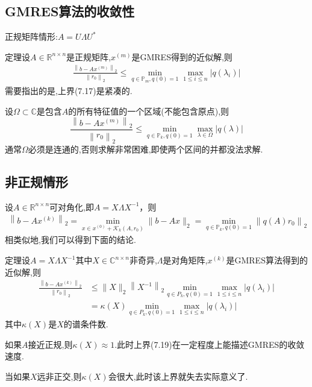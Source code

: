 \documentclass[12pt,a4paper]{article}
\begin{document}
\subsection*{GMRES算法的收敛性}
正规矩阵情形:{\color{blue}$A=U \Lambda U^{*}$}

{\color{blue}定理}\quad 设$A \in \mathbb{R}^{n \times n}$是正规矩阵,$x^{(m)}$是GMRES得到的近似解,则
\begin{align*}
	\frac{\left\|b-A x^{(m)}\right\|_{2}}{\left\|r_{0}\right\|_{2}} \leq \min _{q \in \mathbb{P}_{m}, q(0)=1} \max _{1 \leq i \leq n}\left|q\left(\lambda_{i}\right)\right|
	\tag{7.17}
\end{align*}
需要指出的是,上界(7.17)是紧凑的.

设$\Omega \subset \mathbb{C}$是包含$A$的所有特征值的一个区域(不能包含原点),则
$$
\frac{\left\|b-A x^{(m)}\right\|_{2}}{\left\|r_{0}\right\|_{2}} \leq \min _{q \in \mathbb{P}_{k}, q(0)=1} \max _{\lambda \in \Omega}|q(\lambda)|
$$
通常$\Omega$必须是连通的,否则求解非常困难,即使两个区间的并都没法求解.

\subsection*{非正规情形}
{\color{blue}设$A \in \mathbb{R}^{n \times n}$可对角化},即$A=X \Lambda X^{-1}$，则
\begin{align*}
	\left\|b-A x^{(k)}\right\|_{2}=\min _{x \in x^{(0)}+\mathcal{K}_{k}\left(A, r_{0}\right)}\|b-A x\|_{2}=\min _{q \in \mathbb{P}_{k}, q(0)=1}\left\|q(A) r_{0}\right\|_{2}
	\tag{7.18}
\end{align*}
相类似地,我们可以得到下面的结论.

{\color{blue}定理}\quad 设$A=X \Lambda X^{-1}$其中$X \in \mathbb{C}^{n \times n}$非奇异,$\Lambda$是对角矩阵,$x^{(k)}$是GMRES算法得到的近似解,则
\begin{align*}
	\frac{\left\|b-A x^{(k)}\right\|_{2}}{\left\|r_{0}\right\|_{2}} & \leq\|X\|_{2}\left\|X^{-1}\right\|_{2} \min _{q \in P_{k}, q(0)=1} \max _{1 \leq i \leq n}\left|q\left(\lambda_{i}\right)\right| \\ &=\kappa(X) \min _{q \in P_{k}, q(0)=1} \max _{1 \leq i \leq n}\left|q\left(\lambda_{i}\right)\right|
	\tag{7.19}
\end{align*}
其中$\kappa(X)$是$X$的谱条件数.

如果$A$接近正规,则$\kappa(X) \approx 1$.此时上界(7.19)在一定程度上能描述GMRES的收敛速度.

当如果$X$远非正交,则$\kappa(X)$会很大,此时该上界就失去实际意义了.
\end{document}
